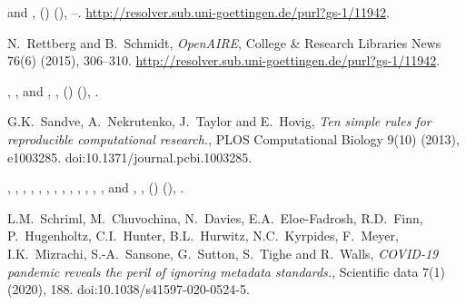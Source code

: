 \documentclass[ds,v1.1.2,openaccess]{iosart2x}%
\begin{document}
\begin{thebibliography}{}
%
\begin{barticle}
 and
,
()
(),
--.
\url{http://resolver.sub.uni-goettingen.de/purl?gs-1/11942}.
\end{barticle}
%
\OrigBibText
N.~Rettberg and
B.~Schmidt,
\textit{OpenAIRE},
College \& Research Libraries News
76(6)
(2015),
306--310.
\url{http://resolver.sub.uni-goettingen.de/purl?gs-1/11942}.
\endOrigBibText
{}
\endbibitem

%
\begin{barticle}
,
,
 and
,
,
()
(),
.
\end{barticle}
%
\OrigBibText
G.K.~Sandve,
A.~Nekrutenko,
J.~Taylor and
E.~Hovig,
\textit{Ten simple rules for reproducible computational research.},
{PLOS} Computational Biology
9(10)
(2013),
e1003285.
doi:10.1371/journal.pcbi.1003285.
\endOrigBibText
{}
\endbibitem

%
\begin{barticle}
,
,
,
,
,
,
,
,
,
,
,
,
,
 and
,
,
()
(),
.
\end{barticle}
%
\OrigBibText
L.M.~Schriml,
M.~Chuvochina,
N.~Davies,
E.A.~Eloe-Fadrosh,
R.D.~Finn,
P.~Hugenholtz,
C.I.~Hunter,
B.L.~Hurwitz,
N.C.~Kyrpides,
F.~Meyer,
I.K.~Mizrachi,
S.-A.~Sansone,
G.~Sutton,
S.~Tighe and
R.~Walls,
\textit{{COVID}-19 pandemic reveals the peril of ignoring metadata
standards.},
Scientific data
7(1)
(2020),
188.
doi:10.1038/s41597-020-0524-5.
\endOrigBibText
{}
\endbibitem


\end{thebibliography}
\end{document}
